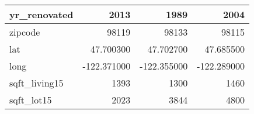 \begin{table}[H]
\begin{tabular}{|l|r|r|r|}
\hline yr\_renovated & \cellcolor[rgb]{0.9, 0.54, 0.52} 2013 & 1989 & 2004 \\
\hline zipcode & \cellcolor[rgb]{0.9, 0.54, 0.52} 98119 & 98133 & 98115 \\
\hline lat & \cellcolor[rgb]{0.9, 0.54, 0.52} 47.700300 & 47.702700 & 47.685500 \\
\hline long & \cellcolor[rgb]{0.9, 0.54, 0.52} -122.371000 & \cellcolor[rgb]{0.9, 0.54, 0.52} -122.355000 & \cellcolor[rgb]{0.9, 0.54, 0.52} -122.289000 \\
\hline sqft\_living15 & \cellcolor[rgb]{0.9, 0.54, 0.52} 1393 & 1300 & 1460 \\
\hline sqft\_lot15 & \cellcolor[rgb]{0.9, 0.54, 0.52} 2023 & 3844 & 4800 \\
\hline
\end{tabular}
\end{table}
